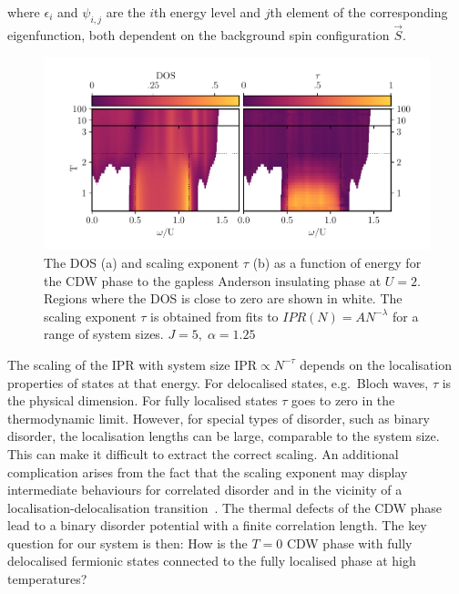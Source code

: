 where \(\epsilon_i\) and \(\psi_{i,j}\) are the \(i\)th energy level and \(j\)th element of the corresponding eigenfunction, both dependent on the background spin configuration \(\vec{S}\).

\hypertarget{fig:gap_opening_U2}{%
\begin{figure}
\centering
\includegraphics[width=1\textwidth,height=\textheight]{figure_code/fk_chapter/gap_opening/gap_opening_U2}
\caption[{The transition from CDW to the Anderson Phase}]{The DOS (a) and scaling exponent \(\tau\) (b) as a function of energy for the CDW phase to the gapless Anderson insulating phase at \(U=2\). Regions where the DOS is close to zero are shown in white. The scaling exponent \(\tau\) is obtained from fits to \(IPR(N) = A N^{-\lambda}\) for a range of system sizes. \(J = 5,\;\alpha = 1.25\)}
\label{fig:gap_opening_U2}
\end{figure}
}

The scaling of the IPR with system size \(\mathrm{IPR} \propto N^{-\tau}\) depends on the localisation properties of states at that energy. For delocalised states, e.g.~Bloch waves, \(\tau\) is the physical dimension. For fully localised states \(\tau\) goes to zero in the thermodynamic limit. However, for special types of disorder, such as binary disorder, the localisation lengths can be large, comparable to the system size. This can make it difficult to extract the correct scaling. An additional complication arises from the fact that the scaling exponent may display intermediate behaviours for correlated disorder and in the vicinity of a localisation-delocalisation transition~\autocite{kramerLocalizationTheoryExperiment1993,eversAndersonTransitions2008}. The thermal defects of the CDW phase lead to a binary disorder potential with a finite correlation length. The key question for our system is then: How is the \(T=0\) CDW phase with fully delocalised fermionic states connected to the fully localised phase at high temperatures?

